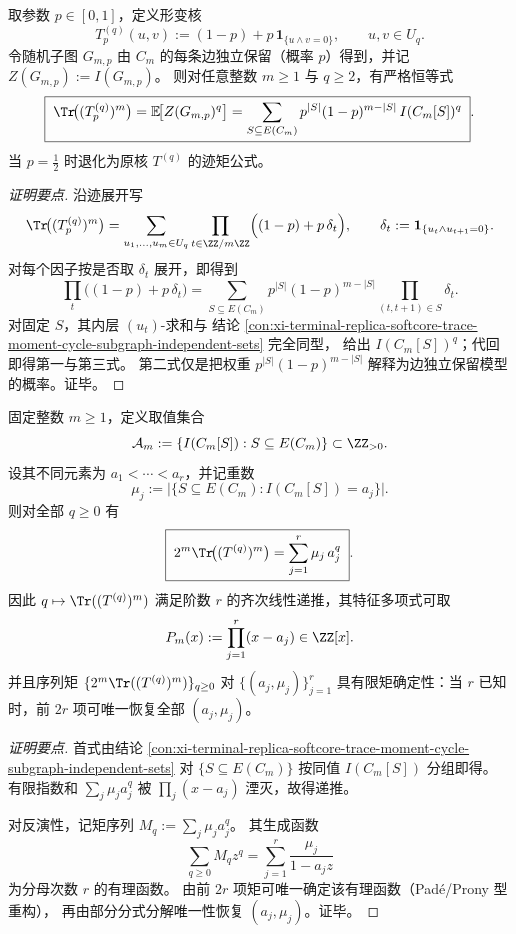 \begin{conclusion}[边伯努利形变下的随机环图独立集矩表示]\label{con:xi-terminal-replica-softcore-trace-moment-bernoulli-deformation-random-cycle}
取参数 \(p\in[0,1]\)，定义形变核
\[
T^{(q)}_{p}(u,v):=(1-p)+p\,\mathbf{1}_{\{u\wedge v=0\}},
\qquad u,v\in U_q.
\]
令随机子图 \(G_{m,p}\) 由 \(C_m\) 的每条边独立保留（概率 \(p\)）得到，并记
\(
Z(G_{m,p}):=I(G_{m,p})
\)。
则对任意整数 \(m\ge 1\) 与 \(q\ge 2\)，有严格恒等式
\[
\boxed{\;
\Tr\!\bigl((T^{(q)}_{p})^m\bigr)
=\mathbb E\!\bigl[Z(G_{m,p})^{q}\bigr]
=\sum_{S\subseteq E(C_m)}p^{|S|}(1-p)^{m-|S|}\,I(C_m[S])^{q}\; } .
\]
当 \(p=\tfrac12\) 时退化为原核 \(T^{(q)}\) 的迹矩公式。
\end{conclusion}
\begin{proof}[证明要点]
沿迹展开写
\[
\Tr\!\bigl((T^{(q)}_{p})^m\bigr)
=\sum_{u_1,\dots,u_m\in U_q}\prod_{t\in\ZZ/m\ZZ}\Bigl((1-p)+p\,\delta_t\Bigr),
\qquad
\delta_t:=\mathbf 1_{\{u_t\wedge u_{t+1}=0\}}.
\]
对每个因子按是否取 \(\delta_t\) 展开，即得到
\[
\prod_t\bigl((1-p)+p\,\delta_t\bigr)
=\sum_{S\subseteq E(C_m)}p^{|S|}(1-p)^{m-|S|}\prod_{(t,t+1)\in S}\delta_t.
\]
对固定 \(S\)，其内层 \((u_t)\)-求和与
结论 \ref{con:xi-terminal-replica-softcore-trace-moment-cycle-subgraph-independent-sets} 完全同型，
给出 \(I(C_m[S])^{q}\)；代回即得第一与第三式。
第二式仅是把权重 \(p^{|S|}(1-p)^{m-|S|}\) 解释为边独立保留模型的概率。证毕。
\end{proof}

\begin{conclusion}[固定 \(m\) 下的独立集谱反演与最小递推]\label{con:xi-terminal-replica-softcore-cycle-subgraph-spectrum-inversion-minimal-recurrence}
固定整数 \(m\ge 1\)，定义取值集合
\[
\mathcal A_m:=\{I(C_m[S]):S\subseteq E(C_m)\}\subset\ZZ_{>0}.
\]
设其不同元素为 \(a_1<\cdots<a_r\)，并记重数
\[
\mu_j:=\bigl|\{S\subseteq E(C_m):I(C_m[S])=a_j\}\bigr|.
\]
则对全部 \(q\ge 0\) 有
\[
\boxed{\;
2^m\Tr\!\bigl((T^{(q)})^m\bigr)=\sum_{j=1}^{r}\mu_j\,a_j^{q}\; } .
\]
因此 \(q\mapsto \Tr((T^{(q)})^m)\) 满足阶数 \(r\) 的齐次线性递推，其特征多项式可取
\[
P_m(x):=\prod_{j=1}^{r}(x-a_j)\in\ZZ[x].
\]
并且序列矩 \(\{2^m\Tr((T^{(q)})^m)\}_{q\ge 0}\) 对 \(\{(a_j,\mu_j)\}_{j=1}^{r}\) 具有限矩确定性：当 \(r\) 已知时，前 \(2r\) 项可唯一恢复全部 \((a_j,\mu_j)\)。
\end{conclusion}
\begin{proof}[证明要点]
首式由结论 \ref{con:xi-terminal-replica-softcore-trace-moment-cycle-subgraph-independent-sets}
对 \(\{S\subseteq E(C_m)\}\) 按同值 \(I(C_m[S])\) 分组即得。
有限指数和 \(\sum_j\mu_j a_j^q\) 被 \(\prod_j(x-a_j)\) 湮灭，故得递推。
\par
对反演性，记矩序列 \(M_q:=\sum_j\mu_j a_j^q\)。
其生成函数
\[
\sum_{q\ge 0}M_q z^q=\sum_{j=1}^{r}\frac{\mu_j}{1-a_j z}
\]
为分母次数 \(r\) 的有理函数。
由前 \(2r\) 项矩可唯一确定该有理函数（Pad\'e/Prony 型重构），
再由部分分式分解唯一性恢复 \((a_j,\mu_j)\)。证毕。
\end{proof}

